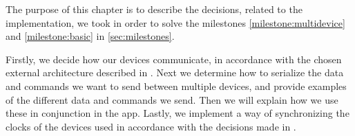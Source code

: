 The purpose of this chapter is to describe the decisions, related to the implementation, 
we took in order to solve the milestones \ref{milestone:multidevice} and \ref{milestone:basic} in \cref{sec:milestones}.

Firstly, we decide how our devices communicate, in accordance with the chosen external architecture described in .
Next we determine how to serialize the data and commands we want to send between multiple devices, and provide examples of the different data and commands we send.
Then we will explain how we use these in conjunction in the app. 
Lastly, we implement a way of synchronizing the clocks of the devices used in accordance with the decisions made in .
